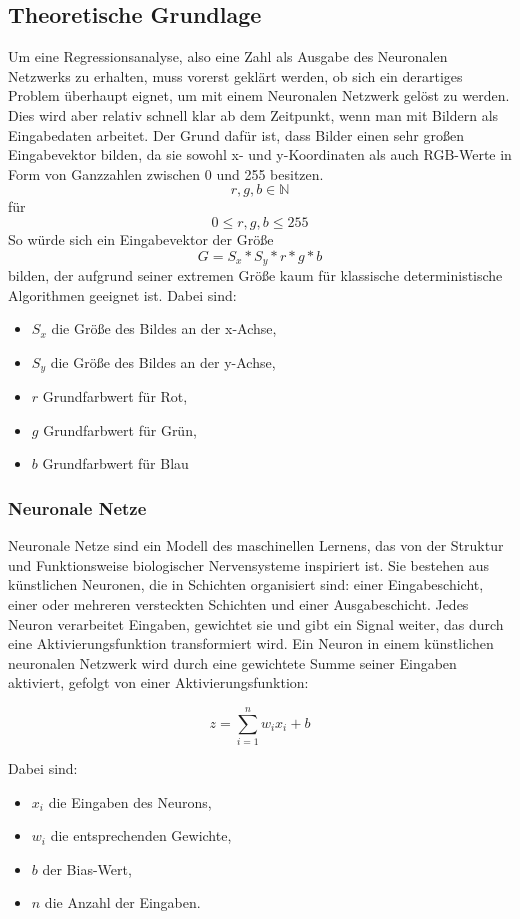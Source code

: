 \subsection{Theoretische Grundlage}
Um eine Regressionsanalyse, also eine Zahl als Ausgabe des Neuronalen Netzwerks zu erhalten, muss vorerst geklärt werden, ob sich ein derartiges Problem überhaupt eignet, um mit einem Neuronalen Netzwerk gelöst zu werden. Dies wird aber relativ schnell klar ab dem Zeitpunkt, wenn man mit Bildern als Eingabedaten arbeitet. Der Grund dafür ist, dass Bilder einen sehr großen Eingabevektor bilden, da sie sowohl x- und y-Koordinaten als auch RGB-Werte in Form von Ganzzahlen zwischen 0 und 255 besitzen. 
\[r, g, b \in \mathbb{N}\] für \[0 \leq r, g, b \leq 255\]
So würde sich ein Eingabevektor der Größe
\[G = S_x * S_y * r * g * b\] bilden, der aufgrund seiner extremen Größe kaum für klassische deterministische Algorithmen geeignet ist. 
Dabei sind:
\begin{itemize}
    \item $S_x$ die Größe des Bildes an der x-Achse,
    \item $S_y$ die Größe des Bildes an der y-Achse,
    \item $r$ Grundfarbwert für Rot,
    \item $g$ Grundfarbwert für Grün,
    \item $b$ Grundfarbwert für Blau
\end{itemize}
\subsubsection{Neuronale Netze}

Neuronale Netze sind ein Modell des maschinellen Lernens, das von der Struktur und Funktionsweise biologischer Nervensysteme inspiriert ist. Sie bestehen aus künstlichen Neuronen, die in Schichten organisiert sind: einer Eingabeschicht, einer oder mehreren versteckten Schichten und einer Ausgabeschicht. Jedes Neuron verarbeitet Eingaben, gewichtet sie und gibt ein Signal weiter, das durch eine Aktivierungsfunktion transformiert wird.
Ein Neuron in einem künstlichen neuronalen Netzwerk wird durch eine gewichtete Summe seiner Eingaben aktiviert, gefolgt von einer Aktivierungsfunktion:

\begin{equation}
    z = \sum_{i=1}^{n} w_i x_i + b
\end{equation}

Dabei sind:
\begin{itemize}
    \item $x_i$ die Eingaben des Neurons,
    \item $w_i$ die entsprechenden Gewichte,
    \item $b$ der Bias-Wert,
    \item $n$ die Anzahl der Eingaben.
\end{itemize}

